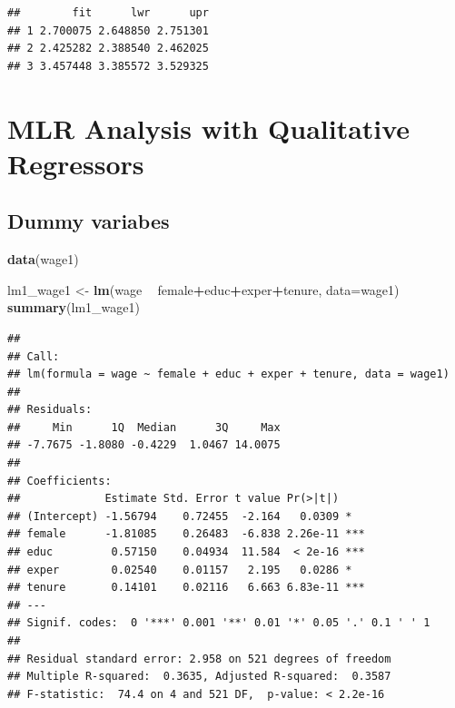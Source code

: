 \documentclass[]{book}
\newenvironment{Shaded}{\begin{snugshade}}{\end{snugshade}}
\newcommand{\DataTypeTok}[1]{\textcolor[rgb]{0.13,0.29,0.53}{#1}}
\newcommand{\KeywordTok}[1]{\textcolor[rgb]{0.13,0.29,0.53}{\textbf{#1}}}
\newcommand{\NormalTok}[1]{#1}
\newcommand{\OperatorTok}[1]{\textcolor[rgb]{0.81,0.36,0.00}{\textbf{#1}}}
\newcommand{\StringTok}[1]{\textcolor[rgb]{0.31,0.60,0.02}{#1}}
\begin{document}
\begin{verbatim}
##        fit      lwr      upr
## 1 2.700075 2.648850 2.751301
## 2 2.425282 2.388540 2.462025
## 3 3.457448 3.385572 3.529325
\end{verbatim}

\hypertarget{mlr-analysis-with-qualitative-regressors}{%
\section{MLR Analysis with Qualitative
Regressors}\label{mlr-analysis-with-qualitative-regressors}}

\hypertarget{dummy-variabes}{%
\subsection{Dummy variabes}\label{dummy-variabes}}

\begin{Shaded}
\begin{Highlighting}[]
\KeywordTok{data}\NormalTok{(wage1)}
\end{Highlighting}
\end{Shaded}

\begin{Shaded}
\begin{Highlighting}[]
\NormalTok{lm1_wage1 <-}\StringTok{ }\KeywordTok{lm}\NormalTok{(wage }\OperatorTok{~}\StringTok{ }\NormalTok{female}\OperatorTok{+}\NormalTok{educ}\OperatorTok{+}\NormalTok{exper}\OperatorTok{+}\NormalTok{tenure, }\DataTypeTok{data=}\NormalTok{wage1)}
\KeywordTok{summary}\NormalTok{(lm1_wage1)}
\end{Highlighting}
\end{Shaded}

\begin{verbatim}
## 
## Call:
## lm(formula = wage ~ female + educ + exper + tenure, data = wage1)
## 
## Residuals:
##     Min      1Q  Median      3Q     Max 
## -7.7675 -1.8080 -0.4229  1.0467 14.0075 
## 
## Coefficients:
##             Estimate Std. Error t value Pr(>|t|)    
## (Intercept) -1.56794    0.72455  -2.164   0.0309 *  
## female      -1.81085    0.26483  -6.838 2.26e-11 ***
## educ         0.57150    0.04934  11.584  < 2e-16 ***
## exper        0.02540    0.01157   2.195   0.0286 *  
## tenure       0.14101    0.02116   6.663 6.83e-11 ***
## ---
## Signif. codes:  0 '***' 0.001 '**' 0.01 '*' 0.05 '.' 0.1 ' ' 1
## 
## Residual standard error: 2.958 on 521 degrees of freedom
## Multiple R-squared:  0.3635, Adjusted R-squared:  0.3587 
## F-statistic:  74.4 on 4 and 521 DF,  p-value: < 2.2e-16
\end{verbatim}
\end{document}
